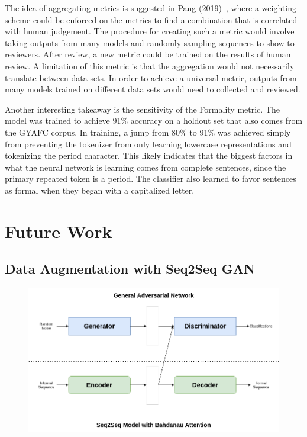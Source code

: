 \documentclass[12pt]{article}
\begin{document}
The idea of aggregating metrics is suggested in Pang (2019)~\cite{pang2019daunting}, where a weighting
scheme could be enforced on the metrics to find a combination that is correlated with human judgement. 
The procedure for creating such a metric would involve taking outputs from many models and randomly sampling 
sequences to show to reviewers. After review, a new metric could be trained on the results of human 
review. A limitation of this metric is that the aggregation would not necessarily 
translate between data sets. In order to achieve a universal metric, outputs from many models trained on 
different data sets would need to collected and reviewed. 

\par
Another interesting takeaway is the sensitivity of the Formality metric. The model was trained to 
achieve 91\% accuracy on a holdout set that also comes from the GYAFC corpus. 
In training, a jump from 80\% to 91\% was achieved simply from preventing the tokenizer from 
only learning lowercase representations and tokenizing the period character. 
This likely indicates that the biggest factors in what the neural network is learning comes from 
complete sentences, since the primary repeated token is a period. The classifier also learned to 
favor sentences as formal when they began with a capitalized letter. 


\section{Future Work}
\subsection{Data Augmentation with Seq2Seq GAN}
\begin{figure}[t]
    \centering
    \includegraphics[scale=0.4]{GAN Generation.png}
\end{figure}
\end{document}
